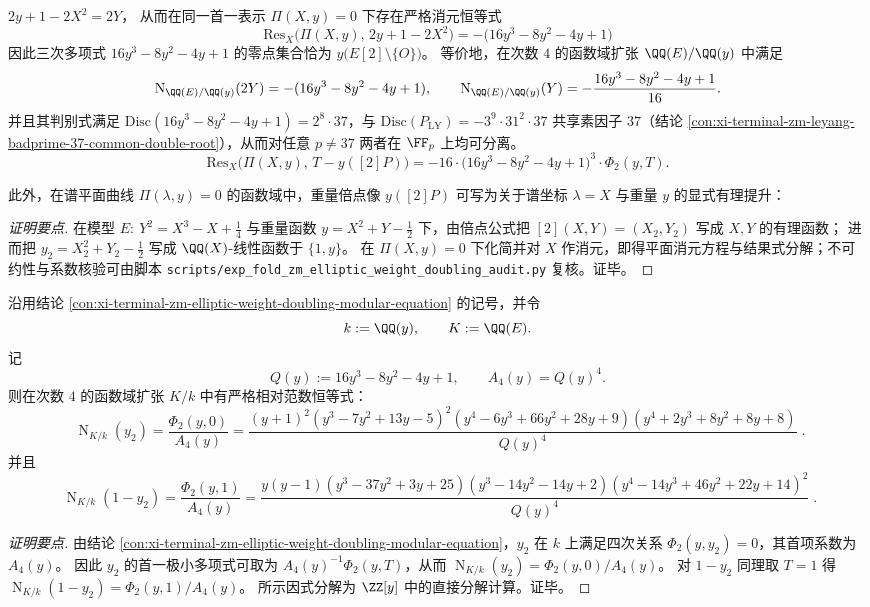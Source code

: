 \begin{conclusion}
\(
2y+1-2X^{2}=2Y
\)，
从而在同一首一表示 \(\Pi(X,y)=0\) 下存在严格消元恒等式
\[
\boxed{\;
\mathrm{Res}_{X}\bigl(\Pi(X,y),\,2y+1-2X^{2}\bigr)
=-\bigl(16y^{3}-8y^{2}-4y+1\bigr)\;}
\]
因此三次多项式 \(16y^{3}-8y^{2}-4y+1\) 的零点集合恰为 \(y\bigl(E[2]\setminus\{O\}\bigr)\)。
等价地，在次数 \(4\) 的函数域扩张 \(\QQ(E)/\QQ(y)\) 中满足
\[
\operatorname{N}_{\QQ(E)/\QQ(y)}(2Y)=-(16y^{3}-8y^{2}-4y+1),
\qquad
\operatorname{N}_{\QQ(E)/\QQ(y)}(Y)=-\frac{16y^{3}-8y^{2}-4y+1}{16}.
\]
并且其判别式满足 \(\mathrm{Disc}(16y^{3}-8y^{2}-4y+1)=2^{8}\cdot 37\)，与 \(\mathrm{Disc}(P_{\mathrm{LY}})=-3^{9}\cdot 31^{2}\cdot 37\) 共享素因子 \(37\)（结论 \ref{con:xi-terminal-zm-leyang-badprime-37-common-double-root}），从而对任意 \(p\neq 37\) 两者在 \(\FF_{p}\) 上均可分离。
\[
\mathrm{Res}_{X}\bigl(\Pi(X,y),\,T-y([2]P)\bigr)
=-16\cdot\bigl(16y^{3}-8y^{2}-4y+1\bigr)^{3}\cdot \Phi_{2}(y,T).
\]
\par
此外，在谱平面曲线 \(\Pi(\lambda,y)=0\) 的函数域中，重量倍点像 \(y([2]P)\) 可写为关于谱坐标 \(\lambda=X\) 与重量 \(y\) 的显式有理提升：

\end{conclusion}
\begin{proof}[证明要点]
在模型 \(E:\ Y^{2}=X^{3}-X+\tfrac14\) 与重量函数 \(y=X^{2}+Y-\tfrac12\) 下，由倍点公式把 \([2](X,Y)=(X_{2},Y_{2})\) 写成 \(X,Y\) 的有理函数；
进而把 \(y_{2}=X_{2}^{2}+Y_{2}-\tfrac12\) 写成 \(\QQ(X)\)-线性函数于 \(\{1,y\}\)。
在 \(\Pi(X,y)=0\) 下化简并对 \(X\) 作消元，即得平面消元方程与结果式分解；不可约性与系数核验可由脚本 \texttt{scripts/exp\_fold\_zm\_elliptic\_weight\_doubling\_audit.py} 复核。证毕。
\end{proof}

\begin{conclusion}\label{con:xi-terminal-zm-elliptic-weight-doubling-norms-0-1}
沿用结论 \ref{con:xi-terminal-zm-elliptic-weight-doubling-modular-equation} 的记号，并令
\[
k:=\QQ(y),\qquad K:=\QQ(E).
\]
记
\[
Q(y):=16y^{3}-8y^{2}-4y+1,
\qquad
A_{4}(y)=Q(y)^{4}.
\]
则在次数 \(4\) 的函数域扩张 \(K/k\) 中有严格相对范数恒等式：
\[
\boxed{\;
\operatorname{N}_{K/k}(y_{2})
=\frac{\Phi_{2}(y,0)}{A_{4}(y)}
=\frac{(y+1)^{2}(y^{3}-7y^{2}+13y-5)^{2}(y^{4}-6y^{3}+66y^{2}+28y+9)(y^{4}+2y^{3}+8y^{2}+8y+8)}{Q(y)^{4}}\; }.
\]
并且
\[
\boxed{\;
\operatorname{N}_{K/k}(1-y_{2})
=\frac{\Phi_{2}(y,1)}{A_{4}(y)}
=\frac{y(y-1)(y^{3}-37y^{2}+3y+25)(y^{3}-14y^{2}-14y+2)(y^{4}-14y^{3}+46y^{2}+22y+14)^{2}}{Q(y)^{4}}\; }.
\]
\end{conclusion}
\begin{proof}[证明要点]
由结论 \ref{con:xi-terminal-zm-elliptic-weight-doubling-modular-equation}，\(y_{2}\) 在 \(k\) 上满足四次关系 \(\Phi_{2}(y,y_{2})=0\)，其首项系数为 \(A_{4}(y)\)。
因此 \(y_{2}\) 的首一极小多项式可取为 \(A_{4}(y)^{-1}\Phi_{2}(y,T)\)，从而 \(\operatorname{N}_{K/k}(y_{2})=\Phi_{2}(y,0)/A_{4}(y)\)。
对 \(1-y_{2}\) 同理取 \(T=1\) 得 \(\operatorname{N}_{K/k}(1-y_{2})=\Phi_{2}(y,1)/A_{4}(y)\)。
所示因式分解为 \(\ZZ[y]\) 中的直接分解计算。证毕。
\end{proof}

